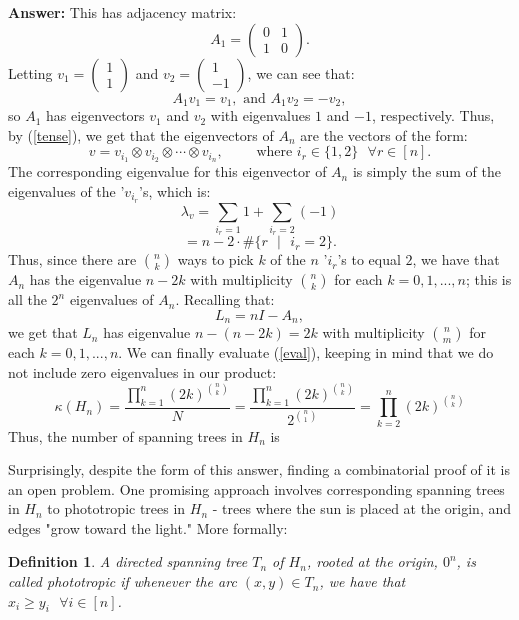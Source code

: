 \documentclass[11pt]{article}
\newtheorem{definition}[theorem]{Definition}
\newenvironment{answer}{\noindent \textbf{Answer:}}{}
\newcommand{\keyword}[1]{{\emph{#1}}}
\begin{document}
\begin{answer}
	This has adjacency matrix:
	$$A_1= \begin{pmatrix} 0 & 1 \\ 1 & 0 \end{pmatrix}.$$
	Letting $v_1 = \begin{pmatrix} 1 \\ 1 \end{pmatrix}$ and $v_2 = \begin{pmatrix} 1 \\ -1 \end{pmatrix}$, we can see that:
	$$A_1v_1 = v_1, \text{ and } A_1v_2=-v_2,$$
	so $A_1$ has eigenvectors $v_1$ and $v_2$ with eigenvalues $1$ and $-1$, respectively. Thus, by
	(\ref{tense}), we get that the eigenvectors of $A_n$ are the vectors of the form:
	$$v = v_{i_1} \otimes v_{i_2} \otimes \dotsb \otimes v_{i_n}, \qquad \text{ where } i_r \in \{1,2\} \text{ } \forall r \in [n].$$
	The corresponding eigenvalue for this eigenvector of $A_n$ is simply the sum of the eigenvalues of the  '$v_{i_r}$'s,
	which is:
	$$\lambda_v = \sum_{i_r = 1}1 + \sum_{i_r = 2}(-1)$$
	$$=n-2\cdot \#\{r \text{ }| \text{ } i_r = 2\}.$$
	Thus, since there are $\binom{n}{k}$ ways to pick $k$ of the $n$ '$i_r$'s to equal $2$,
	we have that $A_n$ has the eigenvalue $n-2k$ with multiplicity $\binom{n}{k}$ for each $k=0,1,...,n$;
	this is all the $2^n$ eigenvalues of $A_n$. Recalling that:
	$$L_n=nI-A_n,$$
	we get that $L_n$ has eigenvalue $n-(n-2k)=2k$ with multiplicity $\binom{n}{m}$ for each $k=0,1,...,n$.
	We can finally evaluate (\ref{eval}), keeping in mind that we do not include zero eigenvalues in our product:
	\begin{equation} \label{ans} \kappa(H_n) = \frac{\prod_{k=1}^n (2k)^{\binom{n}{k}}}{N} = \frac{\prod_{k=1}^n (2k)^{\binom{n}{k}}}{2^{\binom{n}{1}}} = \prod_{k=2}^n (2k)^{\binom{n}{k}} \end{equation}
	Thus, the number of spanning trees in $H_n$ is 
\end{answer}

Surprisingly, despite the form of this answer, finding a combinatorial proof of it is an open problem. One
promising approach involves corresponding spanning trees in $H_n$ to phototropic trees in $H_n$ - trees where
the sun is placed at the origin, and edges "grow toward the light." More formally:

\begin{definition}
	A directed spanning tree $T_n$ of $H_n$, rooted at the origin, $0^n$, is called
	\keyword{phototropic} if whenever the arc $(x,y) \in T_n$, we have that $x_i \geq y_i \text{ } \forall i \in [n]$.
\end{definition}
\end{document}
